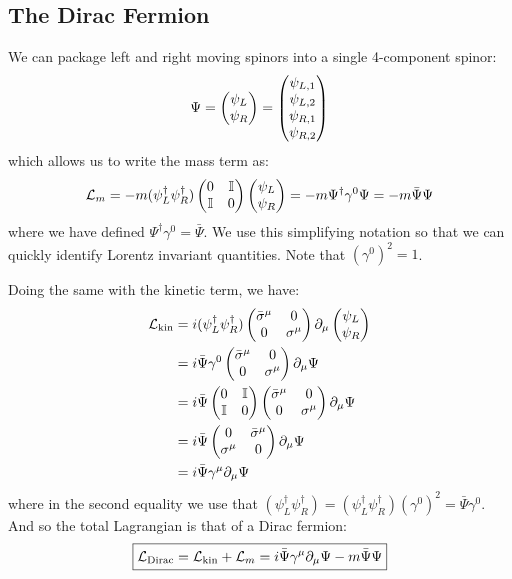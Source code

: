 \subsection{The Dirac Fermion}
We can package left and right moving spinors into a single 4-component spinor:
\begin{equation}
    \Psi = \begin{pmatrix}\psi_L \\ \psi_R\end{pmatrix} = \begin{pmatrix}\psi_{L, 1} \\ \psi_{L, 2} \\ \psi_{R, 1} \\ \psi_{R, 2}\end{pmatrix}
\end{equation}
which allows us to write the mass term as:
\begin{equation}
    \mathcal{L}_m = -m(\psi_L^\dagger \psi_R^\dagger)\begin{pmatrix}0 & \mathbb{I} \\ \mathbb{I} & 0\end{pmatrix}\begin{pmatrix}\psi_L \\ \psi_R\end{pmatrix} = -m\Psi^\dagger \gamma^0\Psi = -m\bar{\Psi}\Psi
\end{equation}
where we have defined $\Psi^\dag\gamma^0 = \bar{\Psi}$. We use this simplifying notation so that we can quickly identify Lorentz invariant quantities. Note that $(\gamma^0)^2 = 1$.

Doing the same with the kinetic term, we have:
\begin{equation}
    \begin{split}
        \mathcal{L}_{\text{kin}} &= i(\psi^\dagger_L \psi^\dagger_R)\begin{pmatrix}\bar{\sigma}^\mu & 0 \\ 0 & \sigma^\mu\end{pmatrix}\partial_\mu \begin{pmatrix}\psi_L \\ \psi_R\end{pmatrix} 
        \\ &= i\bar{\Psi}\gamma^0 \begin{pmatrix}\bar{\sigma}^\mu & 0 \\ 0 & \sigma^\mu\end{pmatrix}\partial_\mu \Psi 
        \\ &= i\bar{\Psi}\begin{pmatrix}0 & \mathbb{I} \\ \mathbb{I} & 0\end{pmatrix}\begin{pmatrix}\bar{\sigma}^\mu & 0 \\ 0 & \sigma^\mu\end{pmatrix}\partial_\mu \Psi
        \\ &= i\bar{\Psi}\begin{pmatrix}0 & \bar{\sigma}^\mu \\ \sigma^\mu & 0\end{pmatrix}\partial_\mu \Psi
        \\ &= i\bar{\Psi}\gamma^\mu \partial_\mu \Psi
    \end{split}
\end{equation}
where in the second equality we use that $(\psi_L^\dag \psi_R^\dag) = (\psi_L^\dag \psi_R^\dag)(\gamma^0)^2 = \bar{\Psi}\gamma^0$. And so the total Lagrangian is that of a Dirac fermion:
\begin{equation}
    \boxed{\mathcal{L}_{\text{Dirac}} = \mathcal{L}_{\text{kin}} + \mathcal{L}_{m} = i\bar{\Psi}\gamma^\mu \partial_\mu \Psi - m\bar{\Psi}\Psi}
\end{equation}

